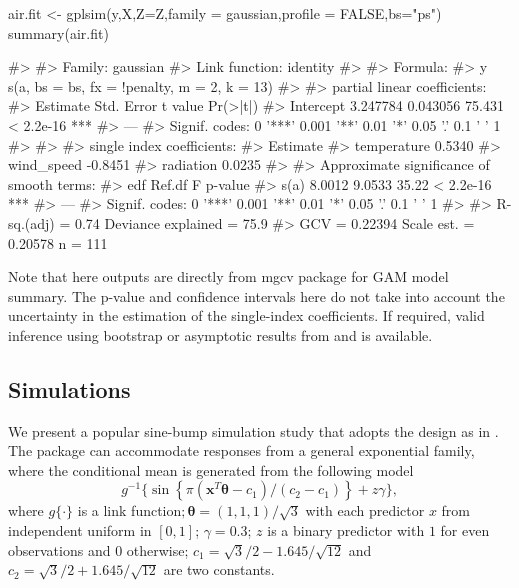 \begin{Schunk}
  \begin{Sinput}
  air.fit <- gplsim(y,X,Z=Z,family = gaussian,profile = FALSE,bs="ps")
  summary(air.fit)
  \end{Sinput}
  \begin{Soutput}
  #> 
  #> Family: gaussian 
  #> Link function: identity 
  #> 
  #> Formula:
  #> y ~ s(a, bs = bs, fx = !penalty, m = 2, k = 13)
  #> 
  #> partial linear coefficients:
  #>           Estimate Std. Error t value  Pr(>|t|)    
  #> Intercept 3.247784   0.043056  75.431 < 2.2e-16 ***
  #> ---
  #> Signif. codes:  0 '***' 0.001 '**' 0.01 '*' 0.05 '.' 0.1 ' ' 1
  #> 
  #> 
  #> single index coefficients:
  #>             Estimate
  #> temperature   0.5340
  #> wind_speed   -0.8451
  #> radiation     0.0235
  #> 
  #> Approximate significance of smooth terms:
  #>         edf Ref.df     F   p-value    
  #> s(a) 8.0012 9.0533 35.22 < 2.2e-16 ***
  #> ---
  #> Signif. codes:  0 '***' 0.001 '**' 0.01 '*' 0.05 '.' 0.1 ' ' 1
  #> 
  #> R-sq.(adj) =   0.74   Deviance explained = 75.9%
  #> GCV = 0.22394  Scale est. = 0.20578   n = 111
  \end{Soutput}
\end{Schunk}

Note that here outputs are directly from mgcv package for GAM model summary. The p-value and confidence intervals here do not take into account the uncertainty in the estimation of the single-index coefficients. If required, valid inference using bootstrap or asymptotic results from \cite{yu_penalized_2002} and \cite{yu_penalised_2017} is available.


\subsection{Simulations}

We present a popular sine-bump simulation study that adopts the design as in \citep{carroll_generalized_1997, yu_penalised_2017, yu_penalized_2002}. The package can accommodate responses from a general exponential family, where the conditional mean is generated from the following model
\begin{equation*}
  g^{-1}\{\sin \left\{\pi\left(\mathbf{x}^{T} \boldsymbol{\theta}-c_{1}\right) /\left(c_{2}-c_{1}\right)\right\}+z \gamma\},
\end{equation*}
where $g\{\cdot\}$ is a link function$; \boldsymbol{\theta} = (1,1,1) / \sqrt{3}$ with each predictor $x$ from independent uniform in $[0,1]$; $\gamma=0.3$; $z$ is a binary predictor with $1$ for even observations and $0$ otherwise; $c_1= \sqrt{3}/2-1.645/\sqrt{12}$ and $c_2= \sqrt{3}/2+1.645/\sqrt{12}$ are two constants. 

